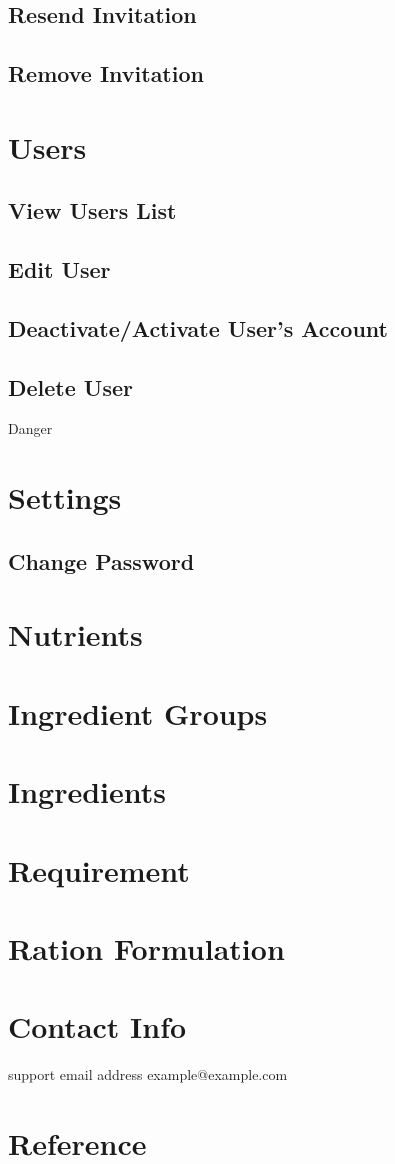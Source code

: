 \documentclass[a4paper,12pt]{article}
\begin{document}
\subsection{Resend Invitation}
\subsection{Remove Invitation}

\section{Users}

\subsection{View Users List}
\subsection{Edit User}
\subsection{Deactivate/Activate User's Account}
\subsection{Delete User}
Danger

\section{Settings}
\subsection{Change Password}


\newpage


\newpage
\section{Nutrients}

\section{Ingredient Groups}

\section{Ingredients}

\section{Requirement}

\section{Ration Formulation}


\newpage
\section{Contact Info}\label{sec:contact_info}

support email address example@example.com

\newpage
\section{Reference}
\printbibliography[title={References}]
\end{document}

